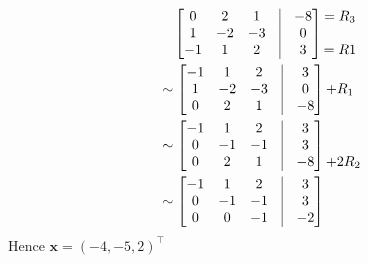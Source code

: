 \documentclass{article}
\begin{document}
\section{}
\begin{align*}
	 & \quad \begin{bmatrix}
		0  & 2  & 1  & \vline & -8 \\
		1  & -2 & -3 & \vline & 0  \\
		-1 & 1  & 2  & \vline & 3
	\end{bmatrix}
	\begin{matrix}
		=R_3 \\
		\\
		=R1
	\end{matrix}          \\
	 & \sim \begin{bmatrix}
		-1 & 1  & 2  & \vline & 3  \\
		1  & -2 & -3 & \vline & 0  \\
		0  & 2  & 1  & \vline & -8
	\end{bmatrix}
	\begin{matrix}
		\\
		+R_1 \\
		\\
	\end{matrix}          \\
	 & \sim \begin{bmatrix}
		-1 & 1  & 2  & \vline & 3  \\
		0  & -1 & -1 & \vline & 3  \\
		0  & 2  & 1  & \vline & -8
	\end{bmatrix}
	\begin{matrix}
		\\
		\\
		+2R_2
	\end{matrix}          \\
	 & \sim \begin{bmatrix}
		-1 & 1  & 2  & \vline & 3  \\
		0  & -1 & -1 & \vline & 3  \\
		0  & 0  & -1 & \vline & -2
	\end{bmatrix}
\end{align*}
Hence $\boldsymbol{x} = (-4, -5, 2)^\intercal$
\end{document}
